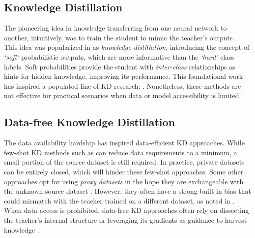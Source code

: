 \subsection{Knowledge Distillation} \label{ssec:02-related-kd}
\begin{foldable} %
    The pioneering idea in knowledge transferring from one neural network to another, intuitively, was to train the student to mimic the teacher's outputs \citep{bucila2006model}.
    This idea was popularized in \citet{hinton2015distilling} as \textit{knowledge distillation}, introducing the concept of \textit{`soft'} probabilistic outputs, which are more informative than the \textit{`hard'} class labels.
    Soft probabilities provide the student with \textit{inter-class} relationships as hints for hidden knowledge, improving its performance.
    This foundational work has inspired a populated line of KD research: \citet{romero2015fitnets, chen2017learning, park2019relational, meng2019conditional, nguyen2021knowledge}.
    Nonetheless, these methods are not effective for practical scenarios when data or model accessibility is limited.
\end{foldable}


\subsection{Data-free Knowledge Distillation} \label{ssec:02-related-dfkd}
\begin{foldable} %
    The data availability hardship has inspired data-efficient KD approaches.
    While few-shot KD methods such as \citet{wang2020neural, nguyen2022black, vo2024improving} can reduce data requirements to a minimum, a small portion of the source dataset is still required.
    In practice, private datasets can be entirely closed, which will hinder these few-shot approaches.
    Some other approaches opt for using \textit{proxy datasets} in the hope they are exchangeable with the unknown source dataset \citep{chen2021learning, tang2023distribution, nguyen2023label}.
    However, they often have a strong built-in bias that could mismatch with the teacher trained on a different dataset, as noted in \citet{torralba2011unbiased}.
    When data access is prohibited, data-free KD approaches often rely on dissecting the teacher's internal structure or leveraging its gradients as guidance to harvest knowledge \citep{chen2019data, fang2019datafree, fang2021contrastive, do2022momentum, tran2024nayer}.
\end{foldable}


